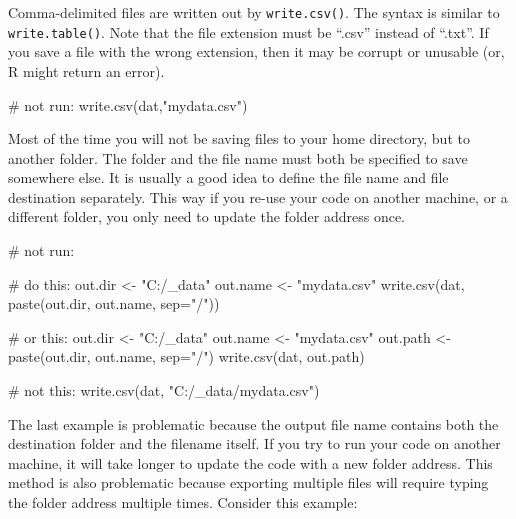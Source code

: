 \documentclass[
  13,
  letterpaper,
]{report}
\newenvironment{Shaded}{\begin{snugshade}}{\end{snugshade}}
\newcommand{\AttributeTok}[1]{\textcolor[rgb]{0.40,0.45,0.13}{#1}}
\newcommand{\CommentTok}[1]{\textcolor[rgb]{0.37,0.37,0.37}{#1}}
\newcommand{\FunctionTok}[1]{\textcolor[rgb]{0.28,0.35,0.67}{#1}}
\newcommand{\NormalTok}[1]{\textcolor[rgb]{0.00,0.23,0.31}{#1}}
\newcommand{\OtherTok}[1]{\textcolor[rgb]{0.00,0.23,0.31}{#1}}
\newcommand{\StringTok}[1]{\textcolor[rgb]{0.13,0.47,0.30}{#1}}
\begin{document}
Comma-delimited files are written out by \texttt{write.csv()}. The
syntax is similar to \texttt{write.table()}. Note that the file
extension must be ``.csv'' instead of ``.txt''. If you save a file with
the wrong extension, then it may be corrupt or unusable (or, R might
return an error).

\begin{Shaded}
\begin{Highlighting}[]
\CommentTok{\# not run:}
\FunctionTok{write.csv}\NormalTok{(dat,}\StringTok{"mydata.csv"}\NormalTok{)}
\end{Highlighting}
\end{Shaded}

Most of the time you will not be saving files to your home directory,
but to another folder. The folder and the file name must both be
specified to save somewhere else. It is usually a good idea to define
the file name and file destination separately. This way if you re-use
your code on another machine, or a different folder, you only need to
update the folder address once.

\begin{Shaded}
\begin{Highlighting}[]
\CommentTok{\# not run:}

\CommentTok{\# do this:}
\NormalTok{out.dir }\OtherTok{\textless{}{-}} \StringTok{"C:/\_data"}
\NormalTok{out.name }\OtherTok{\textless{}{-}} \StringTok{"mydata.csv"}
\FunctionTok{write.csv}\NormalTok{(dat, }\FunctionTok{paste}\NormalTok{(out.dir, out.name, }\AttributeTok{sep=}\StringTok{"/"}\NormalTok{))}

\CommentTok{\# or this:}
\NormalTok{out.dir }\OtherTok{\textless{}{-}} \StringTok{"C:/\_data"}
\NormalTok{out.name }\OtherTok{\textless{}{-}} \StringTok{"mydata.csv"}
\NormalTok{out.path }\OtherTok{\textless{}{-}} \FunctionTok{paste}\NormalTok{(out.dir, out.name, }\AttributeTok{sep=}\StringTok{"/"}\NormalTok{)}
\FunctionTok{write.csv}\NormalTok{(dat, out.path)}

\CommentTok{\# not this:}
\FunctionTok{write.csv}\NormalTok{(dat, }\StringTok{"C:/\_data/mydata.csv"}\NormalTok{)}
\end{Highlighting}
\end{Shaded}

The last example is problematic because the output file name contains
both the destination folder and the filename itself. If you try to run
your code on another machine, it will take longer to update the code
with a new folder address. This method is also problematic because
exporting multiple files will require typing the folder address multiple
times. Consider this example:
\end{document}
